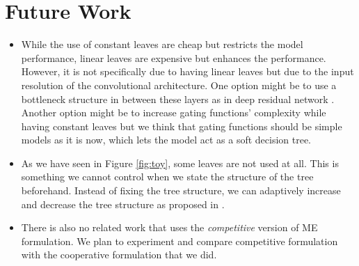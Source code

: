 \documentclass[a4paper,onesided,12pt]{report}
\begin{document}
\section{Future Work}
\label{sec:future}
\begin{itemize}
\item While the use of constant leaves are cheap but restricts the model performance, linear leaves are expensive but enhances the performance. However, it is not specifically due to having linear leaves but due to the input resolution of the convolutional architecture. One option might be to use a bottleneck structure in between these layers as in deep residual network \cite{he2016identity}. Another option might be to increase gating functions' complexity while having constant leaves but we think that gating functions should be simple models as it is now, which lets the model act as a soft decision tree.

\item As we have seen in Figure \ref{fig:toy}, some leaves are not used at all. This is something we cannot control when we state the structure of the tree beforehand. Instead of fixing the tree structure, we can adaptively increase and decrease the tree structure as proposed in \cite{irsoy2012soft,irsoy2014budding}.

\item There is also no related work that uses the \emph{competitive} version of ME formulation. We plan to experiment and compare competitive formulation with the cooperative formulation that we did.
\end{itemize}



\end{document}
